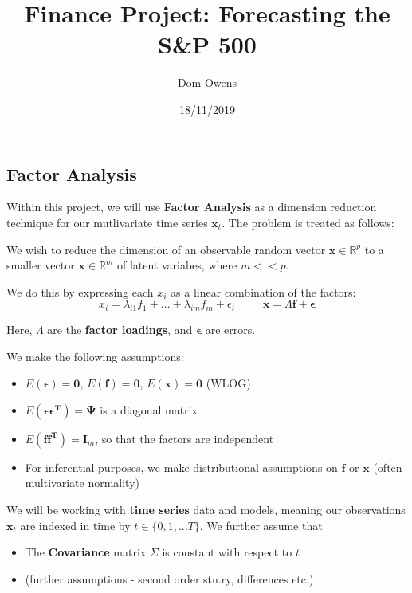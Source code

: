 \documentclass[]{article}
\title{Finance Project: Forecasting the S\&P 500}
\author{Dom Owens}
\date{18/11/2019}
\begin{document}
\maketitle

\hypertarget{factor-analysis}{%
\subsection{Factor Analysis}\label{factor-analysis}}

Within this project, we will use \textbf{Factor Analysis} as a dimension
reduction technique for our mutlivariate time series \(\mathbf{x}_t\).
The problem is treated as follows:

We wish to reduce the dimension of an observable random vector
\(\mathbf{x} \in \mathbb{R}^p\) to a smaller vector
\(\mathbf{x} \in \mathbb{R}^m\) of latent variabes, where \(m << p\).

We do this by expressing each \(x_i\) as a linear combination of the
factors:
\[x_i = \lambda_{i1} f_1 + ... + \lambda_{im} f_m + \epsilon_i \hspace{30pt} \mathbf{x} = \Lambda \mathbf{f} + \boldsymbol{\epsilon}\]

Here, \(\Lambda\) are the \textbf{factor loadings}, and
\(\boldsymbol{\epsilon}\) are errors.

We make the following assumptions:

\begin{itemize}
\item
  \(E(\boldsymbol{\epsilon}) = \boldsymbol{0}\),
  \(E(\boldsymbol{f}) = \boldsymbol{0}\),
  \(E(\boldsymbol{x}) = \boldsymbol{0}\) (WLOG)
\item
  \(E(\boldsymbol{\epsilon \epsilon^T}) = \boldsymbol{\Psi}\) is a
  diagonal matrix
\item
  \(E(\boldsymbol{f f^T}) = \boldsymbol{I}_m\), so that the factors are
  independent
\item
  For inferential purposes, we make distributional assumptions on
  \(\boldsymbol{f}\) or \(\boldsymbol{x}\) (often multivariate
  normality)
\end{itemize}

We will be working with \textbf{time series} data and models, meaning
our observations \(\mathbf{x}_t\) are indexed in time by
\(t \in \{ 0, 1, ... T \}\). We further assume that

\begin{itemize}
\item
  The \textbf{Covariance} matrix \(\Sigma\) is constant with respect to
  \(t\)
\item
  (further assumptions - second order stn.ry, differences etc.)
\end{itemize}
\end{document}
